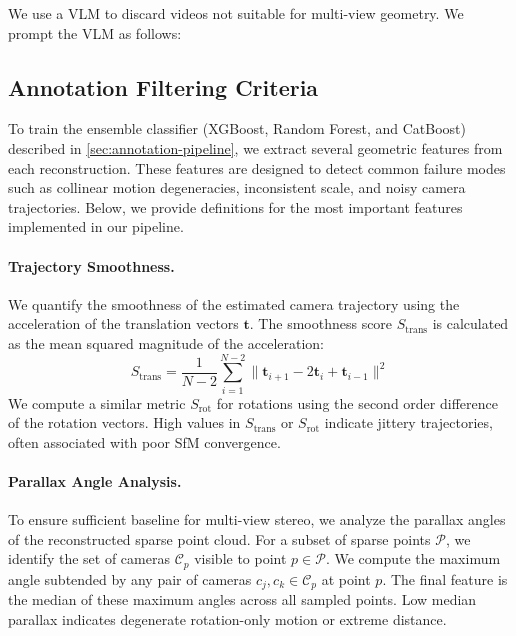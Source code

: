 We use a VLM to discard videos not suitable for multi-view geometry.
We prompt the VLM as follows:



\subsection{Annotation Filtering Criteria}%
\label{sec:impl-filtering}

To train the ensemble classifier (XGBoost, Random Forest, and CatBoost) described in \cref{sec:annotation-pipeline}, we extract several geometric features from each reconstruction.
These features are designed to detect common failure modes such as collinear motion degeneracies, inconsistent scale, and noisy camera trajectories.
Below, we provide definitions for the most important features implemented in our pipeline.

\paragraph{Trajectory Smoothness.}

We quantify the smoothness of the estimated camera trajectory using the acceleration of the translation vectors $\mathbf{t}$.
The smoothness score $S_\text{trans}$ is calculated as the mean squared magnitude of the acceleration:
\begin{equation}
    S_\text{trans} = \frac{1}{N-2} \sum_{i=1}^{N-2} \| \mathbf{t}_{i+1} - 2\mathbf{t}_i + \mathbf{t}_{i-1} \|^2
\end{equation}
We compute a similar metric $S_\text{rot}$ for rotations using the second order difference of the rotation vectors.
High values in $S_\text{trans}$ or $S_\text{rot}$ indicate jittery trajectories, often associated with poor SfM convergence.

\paragraph{Parallax Angle Analysis.}

To ensure sufficient baseline for multi-view stereo, we analyze the parallax angles of the reconstructed sparse point cloud.
For a subset of sparse points $\mathcal{P}$, we identify the set of cameras $\mathcal{C}_p$ visible to point $p \in \mathcal{P}$.
We compute the maximum angle subtended by any pair of cameras $c_j, c_k \in \mathcal{C}_p$ at point $p$.
The final feature is the {median} of these maximum angles across all sampled points.
Low median parallax indicates degenerate rotation-only motion or extreme distance.

